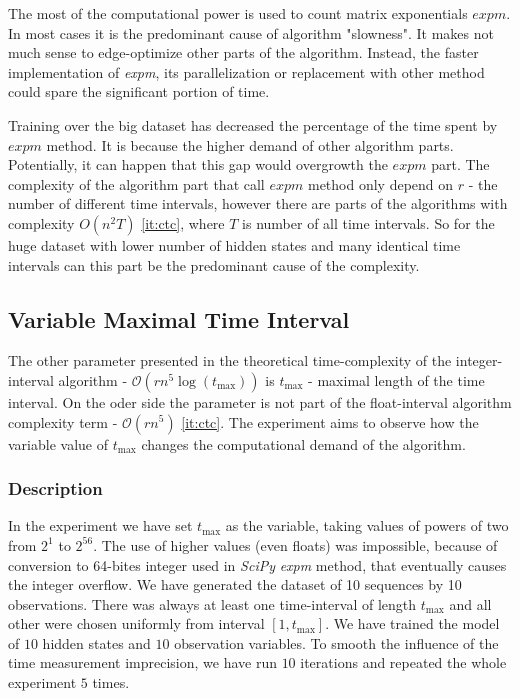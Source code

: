 \documentclass[thesis=M,english]{FITthesis}[2012/10/20]
\begin{document}
The most of the computational power is used to count matrix exponentials $expm$. In most cases it is the predominant cause of algorithm "slowness". It makes not much sense to edge-optimize other parts of the algorithm. Instead, the faster implementation of \textit{expm}, its parallelization or replacement with other method could spare the significant portion of time.      

Training over the big dataset \label{fig:e2big} has decreased the percentage of the time spent by $expm$ method. It is because the higher demand of other algorithm parts. Potentially, it can happen that this gap would overgrowth the $expm$ part. The complexity of the algorithm part that call $expm$ method only depend on $r$ - the number of different time intervals, however there are parts of the algorithms with complexity ${O}(n^2T)$ \ref{it:ctc}, where $T$ is number of all time intervals. So for the huge dataset with lower number of hidden states and many identical time intervals can this part be the predominant cause of the complexity.   

\subsection{Variable Maximal Time Interval}

The other parameter presented in the theoretical time-complexity of the integer-interval algorithm - $\mathcal{O}(r n^5 \log(t_{\max}))$ is $t_{\max}$ - maximal length of the time interval. On the oder side the parameter is not part of the float-interval algorithm complexity term - $\mathcal{O}(r n^5)$ \ref{it:ctc}. The experiment aims to observe how the variable value of $t_{\max}$ changes the computational demand of the algorithm.  


\subsubsection*{ Description }

In the experiment we have set $t_{\max}$ as the variable, taking values of powers of two from $2^1$ to $2^{56}$. The use of higher values (even floats) was impossible, because of conversion to 64-bites integer used in \textit{SciPy} \textit{expm} method, that eventually causes the integer overflow. We have generated the dataset of 10 sequences by 10 observations. There was always at least one time-interval of length $t_{\max}$ and all other were chosen uniformly from interval $[1,t_{\max}]$. We have trained the model of $10$ hidden states and $10$ observation variables. To smooth the influence of the time measurement imprecision, we have run $10$ iterations and repeated the whole experiment $5$ times.   
\end{document}
